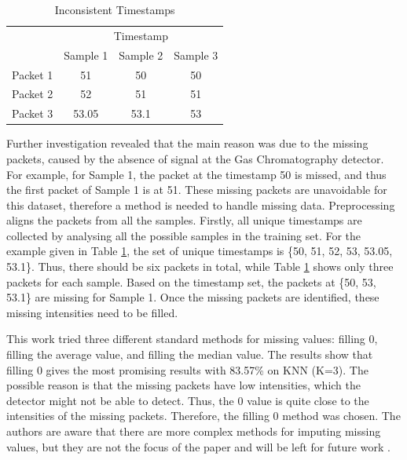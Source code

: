 \documentclass[runningheads]{llncs}
\begin{document}
\begin{table}[t]
  \centering
  \caption{Inconsistent Timestamps}
  \label{tb:badRaw}
  \begin{tabular}{|l|c|c|c|}
    \hline
             & \multicolumn{3}{c|}{Timestamp}                       \\
    \cline{2-4}
             & Sample 1                       & Sample 2 & Sample 3 \\
    \hline 
    Packet 1 & 51                             & 50       & 50       \\
    Packet 2 & 52                             & 51       & 51       \\
    Packet 3 & 53.05                          & 53.1     & 53       \\
    \hline
  \end{tabular}
\end{table}

Further investigation revealed that the main reason was due to the missing packets, caused by the absence of signal at the Gas Chromatography detector. 
For example, for Sample 1, the packet at the timestamp 50 is missed, and thus the first packet of Sample 1 is at 51. 
These missing packets are unavoidable for this dataset, therefore a method is needed to handle missing data. 
Preprocessing aligns the packets from all the samples.
Firstly, all unique timestamps are collected by analysing all the possible samples in the training set. 
For the example given in Table \ref{tb:badRaw}, the set of unique timestamps is \{50, 51, 52, 53, 53.05, 53.1\}. 
Thus, there should be six packets in total, while Table \ref{tb:badRaw} shows only three packets for each sample. 
Based on the timestamp set, the packets at \{50, 53, 53.1\} are missing for Sample 1. 
Once the missing packets are identified, these missing intensities need to be filled.

This work tried three different standard methods for missing values: filling 0, filling the average value, and filling the median value. 
The results show that filling 0 gives the most promising results with 83.57\% on KNN (K=3). 
The possible reason is that the missing packets have low intensities, which the detector might not be able to detect. 
Thus, the 0 value is quite close to the intensities of the missing packets. 
Therefore, the filling 0 method was chosen. 
The authors are aware that there are more complex methods for imputing missing values, but they are not the focus of the paper and will be left for future work \cite{tran2015multiple}.
\end{document}
